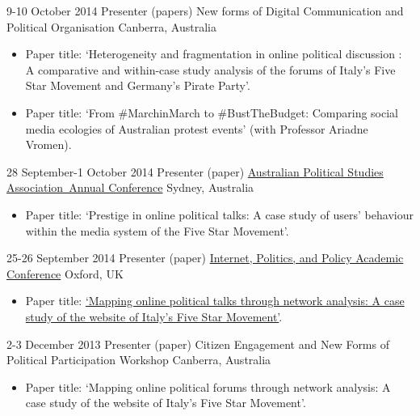 \documentclass[11pt,a4paper,sans]{moderncv}
\begin{document}
    \cventry
    {9-10 October 2014} %
    {Presenter (papers)} %
    {New forms of Digital Communication and Political Organisation} %
    {Canberra, Australia} %
    {}
    {
      \begin{itemize} %
        \item {Paper title: `Heterogeneity and fragmentation in online political discussion : A comparative and within-case study analysis of the forums of Italy's Five Star Movement and Germany’s Pirate Party'.}
         \item{Paper title: `From \#MarchinMarch to \#BustTheBudget: Comparing social media ecologies of Australian protest events' (with Professor Ariadne Vromen).}
      \end{itemize}
    }

    \cventry
        {28 September-1 October 2014} %
    {Presenter (paper)} %
    {\href{https://sites.google.com/site/apsa2014/home}{Australian Political Studies Association Annual Conference}} %
    {Sydney, Australia} %
{}
    {
      \begin{itemize} %
        \item {Paper title: `Prestige in online political talks: A case study of users' behaviour within the media system of the Five Star Movement'.}
      \end{itemize}
    }

    \cventry
        {25-26 September 2014} %
    {Presenter (paper)} %
    {\href{http://ipp.oii.ox.ac.uk/2014}{Internet, Politics, and Policy Academic Conference}} %
    {Oxford, UK} %
{}
    {
      \begin{itemize} %
        \item {Paper title: \href{http://ipp.oii.ox.ac.uk/2014/programme-2014/track-d-networked-politics/political-and-personal-networks/francesco-bailo-mapping-online-political}{`Mapping online political talks through network analysis: A case study of the website of Italy's Five Star Movement'}.}
      \end{itemize}
    }

    \cventry
     {2-3 December 2013} %
    {Presenter (paper)} %
    {Citizen Engagement and New Forms of Political Participation Workshop} %
    {Canberra, Australia} %
    {}
    {
      \begin{itemize} %
        \item {Paper title: `Mapping online political forums through network analysis: A case study of the website of Italy's Five Star Movement'.}
      \end{itemize}
    }
\end{document}
